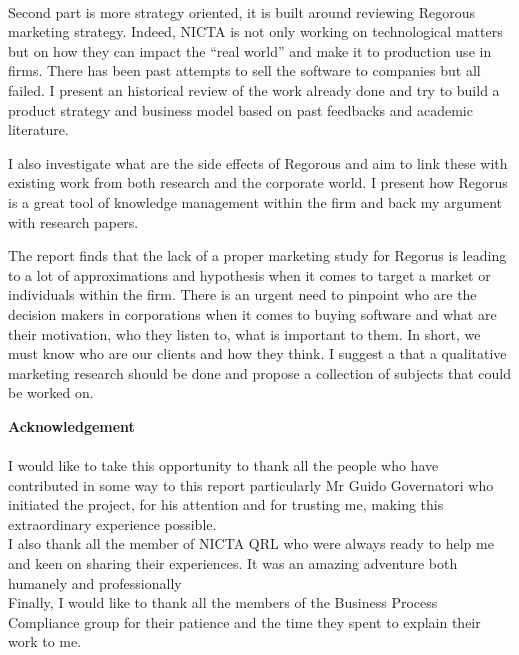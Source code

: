 \documentclass[10pt]{report}
\begin{document}
\begin{center}
\begin{minipage}{\textwidth}
~\\Second part is more strategy oriented, it is built around reviewing Regorous marketing strategy. Indeed, NICTA is not only working on technological matters but on how they can impact the \enquote{real world} and make it to production use in firms. There has been past attempts to sell the software to companies but all failed. I present an historical review of the work already done and try to build a product strategy and business model based on past feedbacks and academic literature.

I also investigate what are the side effects of Regorous and aim to link these with existing work from both research and the corporate world. I present how Regorus is a great tool of knowledge management within the firm and back my argument with research papers.

The report finds that the lack of a proper marketing study for Regorus is leading to a lot of approximations and hypothesis when it comes to target a  market or individuals within the firm. There is an urgent need to pinpoint who are the decision makers in corporations when it comes to buying software and what are their motivation, who they listen to, what is important to them. In short, we must know who are our clients and how they think. I suggest a that a qualitative marketing research should be done and propose a collection of subjects that could be worked on. 

\end{minipage}
\end{center}

\newpage

\begin{center}
\begin{minipage}{.8\textwidth}
\textbf{\large Acknowledgement}\\\\
I would like to take this opportunity to thank all the people who have contributed in some way to this report particularly Mr Guido Governatori who initiated the project, for his attention and for trusting me, making this extraordinary experience possible. \\

I also thank all the member of NICTA QRL who were always ready to help me and keen on sharing their experiences. It was an amazing adventure both humanely and professionally \\

Finally, I would like to thank all the members of the Business Process Compliance group for their patience and the time they spent to explain their work to me.\\

\end{minipage}
\end{center}
\end{document}
